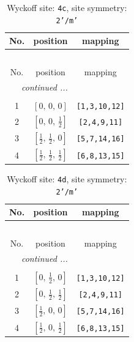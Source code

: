 \documentclass[fleqn,8pt]{jsarticle}
\begin{document}
\renewcommand{\arraystretch}{1.2}
\begin{longtable}{ccc}
\caption{Wyckoff site: {\tt 4c}, site symmetry: {\tt 2'/m'}}
 \\
 \hline \hline
No. & position & mapping \\ \hline \endfirsthead

\multicolumn{2}{l}{\tablename\ \thetable{}} \\
 \hline \hline
No. & position & mapping \\ \hline \endhead

 \hline \hline
\multicolumn{2}{r}{\footnotesize\it continued ...} \\ \endfoot

 \hline \hline
\multicolumn{2}{r}{} \\ \endlastfoot

1 & $\left[ 0,\, 0,\, 0 \right]$ & {\tt [1,3,10,12]} \\ \hline
2 & $\left[ 0,\, 0,\, \frac{1}{2} \right]$ & {\tt [2,4,9,11]} \\ \hline
3 & $\left[ \frac{1}{2},\, \frac{1}{2},\, 0 \right]$ & {\tt [5,7,14,16]} \\ \hline
4 & $\left[ \frac{1}{2},\, \frac{1}{2},\, \frac{1}{2} \right]$ & {\tt [6,8,13,15]} \\
\end{longtable}
\renewcommand{\arraystretch}{1.2}
\begin{longtable}{ccc}
\caption{Wyckoff site: {\tt 4d}, site symmetry: {\tt 2'/m'}}
 \\
 \hline \hline
No. & position & mapping \\ \hline \endfirsthead

\multicolumn{2}{l}{\tablename\ \thetable{}} \\
 \hline \hline
No. & position & mapping \\ \hline \endhead

 \hline \hline
\multicolumn{2}{r}{\footnotesize\it continued ...} \\ \endfoot

 \hline \hline
\multicolumn{2}{r}{} \\ \endlastfoot

1 & $\left[ 0,\, \frac{1}{2},\, 0 \right]$ & {\tt [1,3,10,12]} \\ \hline
2 & $\left[ 0,\, \frac{1}{2},\, \frac{1}{2} \right]$ & {\tt [2,4,9,11]} \\ \hline
3 & $\left[ \frac{1}{2},\, 0,\, 0 \right]$ & {\tt [5,7,14,16]} \\ \hline
4 & $\left[ \frac{1}{2},\, 0,\, \frac{1}{2} \right]$ & {\tt [6,8,13,15]} \\
\end{longtable}
\end{document}
